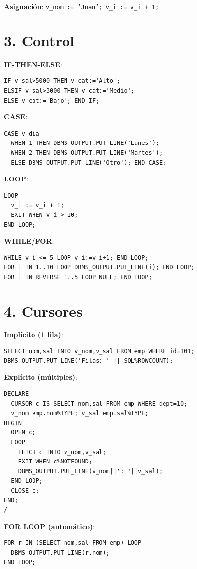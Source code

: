 \documentclass[8pt,a4paper,twocolumn]{article}
\begin{document}
\textbf{Asignación}: \texttt{v\_nom := 'Juan'; v\_i := v\_i + 1;}

\section*{3. Control}

\textbf{IF-THEN-ELSE}:
\begin{lstlisting}
IF v_sal>5000 THEN v_cat:='Alto';
ELSIF v_sal>3000 THEN v_cat:='Medio';
ELSE v_cat:='Bajo'; END IF;
\end{lstlisting}

\textbf{CASE}:
\begin{lstlisting}
CASE v_dia
  WHEN 1 THEN DBMS_OUTPUT.PUT_LINE('Lunes');
  WHEN 2 THEN DBMS_OUTPUT.PUT_LINE('Martes');
  ELSE DBMS_OUTPUT.PUT_LINE('Otro'); END CASE;
\end{lstlisting}

\textbf{LOOP}:
\begin{lstlisting}
LOOP
  v_i := v_i + 1;
  EXIT WHEN v_i > 10;
END LOOP;
\end{lstlisting}

\textbf{WHILE/FOR}:
\begin{lstlisting}
WHILE v_i <= 5 LOOP v_i:=v_i+1; END LOOP;
FOR i IN 1..10 LOOP DBMS_OUTPUT.PUT_LINE(i); END LOOP;
FOR i IN REVERSE 1..5 LOOP NULL; END LOOP;
\end{lstlisting}

\section*{4. Cursores}

\textbf{Implícito (1 fila)}:
\begin{lstlisting}
SELECT nom,sal INTO v_nom,v_sal FROM emp WHERE id=101;
DBMS_OUTPUT.PUT_LINE('Filas: ' || SQL%ROWCOUNT);
\end{lstlisting}

\textbf{Explícito (múltiples)}:
\begin{lstlisting}
DECLARE
  CURSOR c IS SELECT nom,sal FROM emp WHERE dept=10;
  v_nom emp.nom%TYPE; v_sal emp.sal%TYPE;
BEGIN
  OPEN c;
  LOOP
    FETCH c INTO v_nom,v_sal;
    EXIT WHEN c%NOTFOUND;
    DBMS_OUTPUT.PUT_LINE(v_nom||': '||v_sal);
  END LOOP;
  CLOSE c;
END;
/
\end{lstlisting}

\textbf{FOR LOOP (automático)}:
\begin{lstlisting}
FOR r IN (SELECT nom,sal FROM emp) LOOP
  DBMS_OUTPUT.PUT_LINE(r.nom);
END LOOP;
\end{lstlisting}
\end{document}
